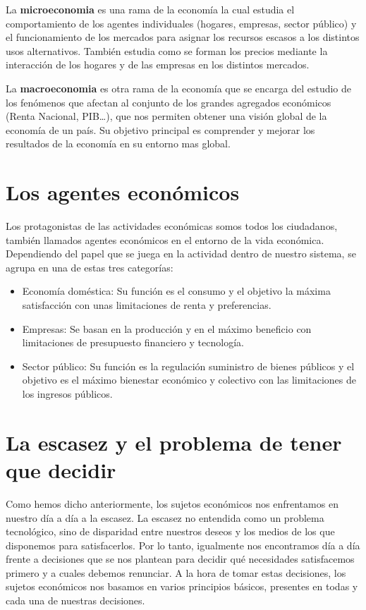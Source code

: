 \documentclass[
]{krantz}
\providecommand{\tightlist}{%
  \setlength{\itemsep}{0pt}\setlength{\parskip}{0pt}}
\begin{document}
La \textbf{microeconomia} es una rama de la economía la cual estudia el comportamiento de los agentes individuales (hogares, empresas, sector público) y el funcionamiento de los mercados para asignar los recursos escasos a los distintos usos alternativos.
También estudia como se forman los precios mediante la interacción de los hogares y de las empresas en los distintos mercados.

La \textbf{macroeconomia} es otra rama de la economía que se encarga del estudio de los fenómenos que afectan al conjunto de los grandes agregados económicos (Renta Nacional, PIB\ldots), que nos permiten obtener una visión global de la economía de un país.
Su objetivo principal es comprender y mejorar los resultados de la economía en su entorno mas global.

\hypertarget{los-agentes-econuxf3micos}{%
\section{Los agentes económicos}\label{los-agentes-econuxf3micos}}

Los protagonistas de las actividades económicas somos todos los ciudadanos, también llamados agentes económicos en el entorno de la vida económica. Dependiendo del papel que se juega en la actividad dentro de nuestro sistema, se agrupa en una de estas tres categorías:

\begin{itemize}
\tightlist
\item
  Economía doméstica: Su función es el consumo y el objetivo la máxima satisfacción con unas limitaciones de renta y preferencias.
\item
  Empresas: Se basan en la producción y en el máximo beneficio con limitaciones de presupuesto financiero y tecnología.
\item
  Sector público: Su función es la regulación suministro de bienes públicos y el objetivo es el máximo bienestar económico y colectivo con las limitaciones de los ingresos públicos.
\end{itemize}

\hypertarget{la-escasez-y-el-problema-de-tener-que-decidir}{%
\section{La escasez y el problema de tener que decidir}\label{la-escasez-y-el-problema-de-tener-que-decidir}}

Como hemos dicho anteriormente, los sujetos económicos nos enfrentamos en nuestro día a día a la escasez. La escasez no entendida como un problema tecnológico, sino de disparidad
entre nuestros deseos y los medios de los que disponemos para satisfacerlos.
Por lo tanto, igualmente nos encontramos día a día frente a decisiones que se nos plantean para decidir qué necesidades satisfacemos primero y a cuales debemos renunciar. A la hora de tomar estas decisiones, los sujetos económicos nos basamos en varios principios básicos, presentes en todas y cada una de nuestras decisiones.
\end{document}
